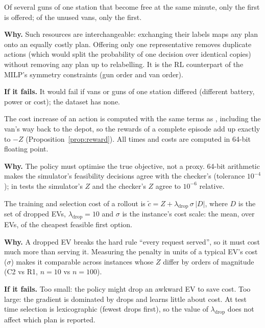 \begin{assumption}\label{as:sym}
Of several guns of one station that become free at the same minute, only the first is offered; of the unused vans, only the first.

\textbf{Why.} Such resources are interchangeable: exchanging their labels maps any plan onto an equally costly plan. Offering only one representative removes duplicate actions (which would split the probability of one decision over identical copies) without removing any plan up to relabelling. It is the RL counterpart of the MILP's symmetry constraints (gun order and van order).

\textbf{If it fails.} It would fail if vans or guns of one station differed (different battery, power or cost); the dataset has none.
\end{assumption}

\begin{assumption}\label{as:reward}
The cost increase of an action is computed with the same terms as , including the van's way back to the depot, so the rewards of a complete episode add up exactly to $-Z$ (Proposition~\ref{prop:reward}). All times and costs are computed in 64-bit floating point.

\textbf{Why.} The policy must optimise the true objective, not a proxy. 64-bit arithmetic makes the simulator's feasibility decisions agree with the checker's (tolerance $10^{-4}$); in tests the simulator's $Z$ and the checker's $Z$ agree to $10^{-6}$ relative.
\end{assumption}

\begin{assumption}\label{as:penalty}
The training and selection cost of a rollout is $\tilde c=Z+\lambda_{\text{drop}}\,\sigma\,|D|$, where $D$ is the set of dropped EVs, $\lambda_{\text{drop}}=10$ and $\sigma$ is the instance's cost scale: the mean, over EVs, of the cheapest feasible first option.

\textbf{Why.} A dropped EV breaks the hard rule ``every request served'', so it must cost much more than serving it. Measuring the penalty in units of a typical EV's cost ($\sigma$) makes it comparable across instances whose $Z$ differ by orders of magnitude (C2 vs R1, $n=10$ vs $n=100$).

\textbf{If it fails.} Too small: the policy might drop an awkward EV to save cost. Too large: the gradient is dominated by drops and learns little about cost. At test time selection is lexicographic (fewest drops first), so the value of $\lambda_{\text{drop}}$ does not affect which plan is reported.
\end{assumption}

